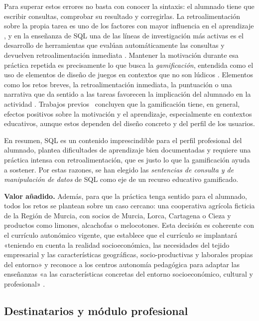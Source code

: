 \documentclass[11pt,a4paper]{article}
\begin{document}
Para superar estos errores no basta con conocer la sintaxis: el alumnado tiene que escribir
consultas, comprobar su resultado y corregirlas. La retroalimentación sobre la propia tarea
es uno de los factores con mayor influencia en el aprendizaje \cite{hattie2007}, y en la
enseñanza de SQL una de las líneas de investigación más activas es el desarrollo de herramientas
que evalúan automáticamente las consultas y devuelven retroalimentación inmediata
\cite{taipalus2020}. Mantener la motivación durante
esa práctica repetida es precisamente lo que busca la \textit{gamificación}, entendida como
el uso de elementos de diseño de juegos en contextos que no son lúdicos \cite{deterding2011}.
Elementos como los retos breves, la retroalimentación inmediata, la puntuación o una
narrativa que da sentido a las tareas favorecen la implicación del alumnado en la actividad
\cite{kapp2012,werbach2012}. Trabajos previos~\cite{hamari2014,dicheva2015,sailer2020}
concluyen que la gamificación tiene, en general, efectos positivos sobre la motivación y el
aprendizaje, especialmente en contextos educativos, aunque estos dependen del diseño
concreto y del perfil de los usuarios.

En resumen, SQL es un contenido imprescindible para el perfil profesional del alumnado,
plantea dificultades de aprendizaje bien documentadas y requiere una práctica intensa con
retroalimentación, que es justo lo que la gamificación ayuda a sostener. Por estas razones,
se han elegido las \emph{sentencias de consulta y de manipulación de datos} de SQL como eje
de un recurso educativo gamificado.

\noindent\textbf{Valor añadido.} Además, para que la práctica tenga sentido para el alumnado, todos los retos se plantean
sobre un caso cercano: una cooperativa agrícola ficticia de la Región de Murcia, con socios
de Murcia, Lorca, Cartagena o Cieza y productos como limones, alcachofas o melocotones.
Esta decisión es coherente con el currículo autonómico vigente, que establece que el
currículo se implantará «teniendo en cuenta la realidad socioeconómica, las necesidades del
tejido empresarial y las características geográficas, socio-productivas y laborales propias
del entorno» y reconoce a los centros autonomía pedagógica para adaptar las enseñanzas «a las
características concretas del entorno socioeconómico, cultural y profesional»
\cite[art.~4]{murcia2026}.

\subsection{Destinatarios y módulo profesional}
\end{document}
